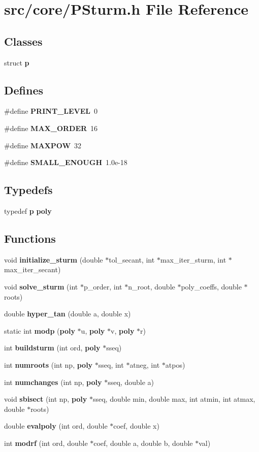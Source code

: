 \section{src/core/PSturm.h File Reference}
\label{PSturm_8h}


\subsection*{Classes}
\begin{CompactItemize}
\item 
struct {\bf p}
\end{CompactItemize}
\subsection*{Defines}
\begin{CompactItemize}
\item 
\#define {\bf PRINT\_\-LEVEL}~0
\item 
\#define {\bf MAX\_\-ORDER}~16
\item 
\#define {\bf MAXPOW}~32
\item 
\#define {\bf SMALL\_\-ENOUGH}~1.0e-18
\end{CompactItemize}
\subsection*{Typedefs}
\begin{CompactItemize}
\item 
typedef {\bf p} {\bf poly}
\end{CompactItemize}
\subsection*{Functions}
\begin{CompactItemize}
\item 
void {\bf initialize\_\-sturm} (double $\ast$tol\_\-secant, int $\ast$max\_\-iter\_\-sturm, int $\ast$max\_\-iter\_\-secant)
\item 
void {\bf solve\_\-sturm} (int $\ast$p\_\-order, int $\ast$n\_\-root, double $\ast$poly\_\-coeffs, double $\ast$roots)
\item 
double {\bf hyper\_\-tan} (double a, double x)
\item 
static int {\bf modp} ({\bf poly} $\ast$u, {\bf poly} $\ast$v, {\bf poly} $\ast$r)
\item 
int {\bf buildsturm} (int ord, {\bf poly} $\ast$sseq)
\item 
int {\bf numroots} (int np, {\bf poly} $\ast$sseq, int $\ast$atneg, int $\ast$atpos)
\item 
int {\bf numchanges} (int np, {\bf poly} $\ast$sseq, double a)
\item 
void {\bf sbisect} (int np, {\bf poly} $\ast$sseq, double min, double max, int atmin, int atmax, double $\ast$roots)
\item 
double {\bf evalpoly} (int ord, double $\ast$coef, double x)
\item 
int {\bf modrf} (int ord, double $\ast$coef, double a, double b, double $\ast$val)
\end{CompactItemize}

